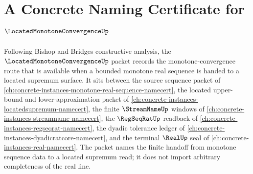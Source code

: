 \chapter{A Concrete Naming Certificate for $\LocatedMonotoneConvergenceUp$}
\label{ch:concrete-instances-located-monotone-convergence-namecert}

Following Bishop and Bridges constructive analysis, the $\LocatedMonotoneConvergenceUp$ packet records the monotone-convergence route that is available when a bounded monotone real sequence is handed to a located supremum surface. It sits between the source sequence packet of \autoref{ch:concrete-instances-monotone-real-sequence-namecert}, the located upper-bound and lower-approximation packet of \autoref{ch:concrete-instances-locatedsupremum-namecert}, the finite $\StreamNameUp$ windows of \autoref{ch:concrete-instances-streamname-namecert}, the $\RegSeqRatUp$ readback of \autoref{ch:concrete-instances-regseqrat-namecert}, the dyadic tolerance ledger of \autoref{ch:concrete-instances-dyadicratcore-namecert}, and the terminal $\RealUp$ seal of \autoref{ch:concrete-instances-real-namecert}. The packet names the finite handoff from monotone sequence data to a located supremum read; it does not import arbitrary completeness of the real line.

